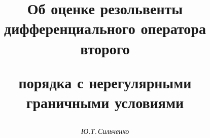 

 


% 


\renewcommand{\baselinestretch}{0.96}


\newcommand{\re}{\operatorname{Re}} 


\newcommand{\tts}[1]{} 


 




\setcounter{page}{65} 












 


\author{\it Ю.Т.\,Сильченко} 




\title{Об оценке резольвенты дифференциального оператора второго 


порядка с нерегулярными граничными условиями} 


 


\date{} 




\pagestyle{plain} %


 




\maketitle 


